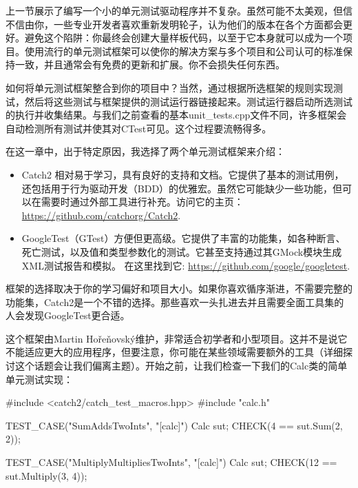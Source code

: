 
上一节展示了编写一个小的单元测试驱动程序并不复杂。虽然可能不太美观，但信不信由你，一些专业开发者喜欢重新发明轮子，认为他们的版本在各个方面都会更好。避免这个陷阱：你最终会创建大量样板代码，以至于它本身就可以成为一个项目。使用流行的单元测试框架可以使你的解决方案与多个项目和公司认可的标准保持一致，并且通常会有免费的更新和扩展。你不会损失任何东西。

如何将单元测试框架整合到你的项目中？当然，通过根据所选框架的规则实现测试，然后将这些测试与框架提供的测试运行器链接起来。测试运行器启动所选测试的执行并收集结果。与我们之前查看的基本unit\_tests.cpp文件不同，许多框架会自动检测所有测试并使其对CTest可见。这个过程要流畅得多。

在这一章中，出于特定原因，我选择了两个单元测试框架来介绍：

\begin{itemize}
\item
Catch2 相对易于学习，具有良好的支持和文档。它提供了基本的测试用例，还包括用于行为驱动开发（BDD）的优雅宏。虽然它可能缺少一些功能，但可以在需要时通过外部工具进行补充。访问它的主页： \url{https://github.com/catchorg/Catch2}.

\item
GoogleTest（GTest）方便但更高级。它提供了丰富的功能集，如各种断言、死亡测试，以及值和类型参数化的测试。它甚至支持通过其GMock模块生成XML测试报告和模拟。 在这里找到它: \url{https://github.com/google/googletest}.
\end{itemize}

框架的选择取决于你的学习偏好和项目大小。如果你喜欢循序渐进，不需要完整的功能集，Catch2是一个不错的选择。那些喜欢一头扎进去并且需要全面工具集的人会发现GoogleTest更合适。


这个框架由Martin Hořeňovský维护，非常适合初学者和小型项目。这并不是说它不能适应更大的应用程序，但要注意，你可能在某些领域需要额外的工具（详细探讨这个话题会让我们偏离主题）。开始之前，让我们检查一下我们的Calc类的简单单元测试实现：


\begin{cpp}
#include <catch2/catch_test_macros.hpp>
#include "calc.h"

TEST_CASE("SumAddsTwoInts", "[calc]") {
    Calc sut;
    CHECK(4 == sut.Sum(2, 2));
}

TEST_CASE("MultiplyMultipliesTwoInts", "[calc]") {
    Calc sut;
    CHECK(12 == sut.Multiply(3, 4));
}
\end{cpp}

